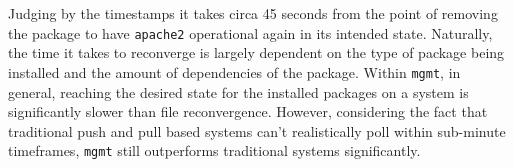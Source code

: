 \noindent
Judging by the timestamps it takes circa 45 seconds from the point of removing the package to have \texttt{apache2} operational again in its intended state. Naturally, the time it takes to reconverge is largely dependent on the type of package being installed and the amount of dependencies of the package. Within \texttt{mgmt}, in general, reaching the desired state for the installed packages on a system is significantly slower than file reconvergence. However, considering the fact that traditional push and pull based systems can't realistically poll within sub-minute timeframes, \texttt{mgmt} still outperforms traditional systems significantly.  

